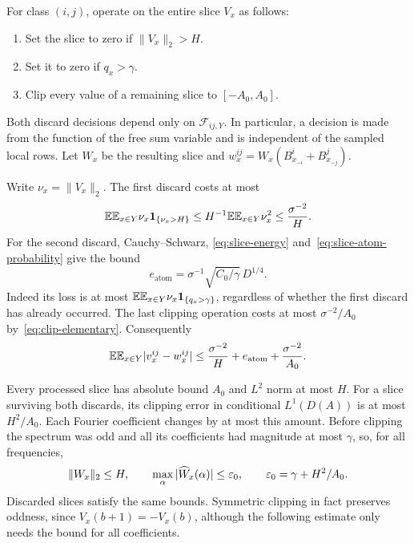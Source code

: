 For class $(i,j)$, operate on the entire slice $V_x$ as follows:
\begin{enumerate}[label=(\roman*),leftmargin=*]
 \item Set the slice to zero if $\|V_x\|_2>H$.
 \item Set it to zero if $q_x>\gamma$.
 \item Clip every value of a remaining slice to $[-A_0,A_0]$.
\end{enumerate}
Both discard decisions depend only on $\mathcal F_{ij,Y}$. In
particular, a decision is made from the function of the free sum
variable and is independent of the sampled local rows. Let $W_x$ be
the resulting slice and
$w^{ij}_x=W_x(B^i_{x_{-i}}+B^j_{x_{-j}})$.

Write $\nu_x=\|V_x\|_2$. The first discard costs at most
\[
 \mathbb E\mathbb E_{x\in Y}\nu_x\mathbf 1_{\{\nu_x>H\}}
 \le H^{-1}\mathbb E\mathbb E_{x\in Y}\nu_x^2\le\frac{\sigma^{-2}}H.
\]
For the second discard, Cauchy--Schwarz,
\eqref{eq:slice-energy} and~\eqref{eq:slice-atom-probability} give
the bound
\begin{equation}\label{eq:atom-discard-loss}
 e_{\mathrm{atom}}=
 \sigma^{-1}\sqrt{C_0/\gamma}\,D^{1/4}.
\end{equation}
Indeed its loss is at most
$\mathbb E\mathbb E_{x\in Y}\nu_x\mathbf 1_{\{q_x>\gamma\}}$, regardless of whether
the first discard has already occurred. The last clipping operation
costs at most $\sigma^{-2}/A_0$ by~\eqref{eq:clip-elementary}.
Consequently
\begin{equation}\label{eq:pair-processing-loss}
 \mathbb E\mathbb E_{x\in Y}|v^{ij}_x-w^{ij}_x|
 \le\frac{\sigma^{-2}}H+e_{\mathrm{atom}}+
       \frac{\sigma^{-2}}{A_0}.
\end{equation}

Every processed slice has absolute bound $A_0$ and $L^2$ norm at most
$H$. For a slice surviving both discards, its clipping error in
conditional $L^1(D(A))$ is at most $H^2/A_0$. Each Fourier coefficient
changes by at most this amount. Before clipping the spectrum was odd
and all its coefficients had magnitude at most $\gamma$, so, for all
frequencies,
\begin{equation}\label{eq:processed-slice-bounds}
 \|W_x\|_2\le H,\qquad
 \max_\alpha|\widehat W_x(\alpha)|\le\varepsilon_0,
 \qquad \varepsilon_0=\gamma+H^2/A_0.
\end{equation}
Discarded slices satisfy the same bounds. Symmetric clipping in fact
preserves oddness, since $V_x(b+1)=-V_x(b)$, although the following
estimate only needs the bound for all coefficients.

